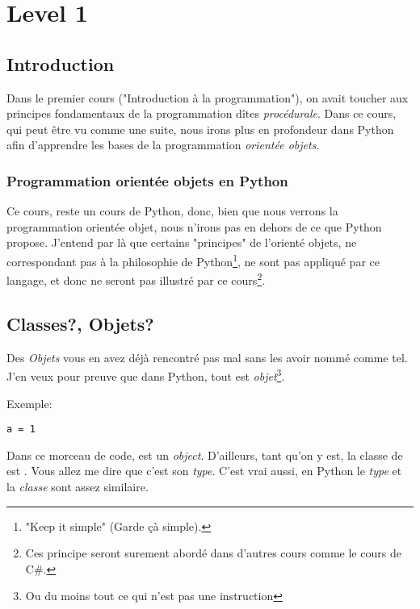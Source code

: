 \chapter{Level 1}
\begin{figure}[ht]
\end{figure}

\section{Introduction}

Dans le premier cours ("Introduction à la programmation"), on avait toucher aux principes fondamentaux de la programmation dîtes \emph{procédurale}. Dans ce cours, qui peut être vu comme une suite, nous irons plus en profondeur dans Python afin d'apprendre les bases de la programmation \emph{orientée objets}.

\subsection{Programmation orientée objets en Python}

Ce cours, reste un cours de Python, donc, bien que nous verrons la programmation orientée objet, nous n'irons pas en dehors de ce que Python propose. J'entend par là que certains "principes" de l'orienté objets, ne correspondant pas à la philosophie de Python\footnote{"Keep it simple" (Garde çà simple).}, ne sont pas appliqué par ce langage, et donc ne seront pas illustré par ce cours\footnote{Ces principe seront surement abordé dans d'autres cours comme le cours de C\#.}.


\section{Classes?, Objets?}

Des \emph{Objets} vous en avez déjà rencontré pas mal sans les avoir nommé comme tel.
J'en veux pour preuve que dans Python, tout est \emph{objet}\footnote{Ou du moins tout ce qui n'est pas une instruction}.

Exemple:

\begin{lstlisting}
a = 1
\end{lstlisting}

Dans ce morceau de code,  est un \emph{object}.
D'ailleurs, tant qu'on y est, la classe de  est .
Vous allez me dire que  c'est son \emph{type}. C'est vrai aussi, en Python le \emph{type} et la \emph{classe} sont assez similaire.

